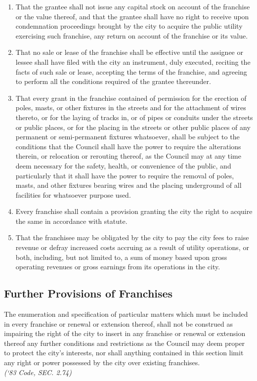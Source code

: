 \begin{enumerate}
    \item That the grantee shall not issue any capital stock on account of the franchise or the value thereof, and that the grantee shall have no right to receive upon condemnation proceedings brought by the city to acquire the public utility exercising such franchise, any return on account of the franchise or its value.
    \item That no sale or lease of the franchise shall be effective until the assignee or lessee shall have filed with the city an instrument, duly executed, reciting the facts of such sale or lease, accepting the terms of the franchise, and agreeing to perform all the conditions required of the grantee thereunder.
    \item That every grant in the franchise contained of permission for the erection of poles, masts, or other fixtures in the streets and for the attachment of wires thereto, or for the laying of tracks in, or of pipes or conduits under the streets or public places, or for the placing in the streets or other public places of any permanent or semi-permanent fixtures whatsoever, shall be subject to the conditions that the Council shall have the power to require the alterations therein, or relocation or rerouting thereof, as the Council may at any time deem necessary for the safety, health, or convenience of the public, and particularly that it shall have the power to require the removal of poles, masts, and other fixtures bearing wires and the placing underground of all facilities for whatsoever purpose used.
    \item Every franchise shall contain a provision granting the city the right to acquire the same in accordance with statute.
    \item That the franchisee may be obligated by the city to pay the city fees to raise revenue or defray increased costs accruing as a result of utility operations, or both, including, but not limited to, a sum of money based upon gross operating revenues or gross earnings from its operations in the city.
\end{enumerate}
\subsection{Further Provisions of Franchises}
The enumeration and specification of particular matters which must be included in every franchise or renewal or extension thereof, shall not be construed as impairing the right of the city to insert in any franchise or renewal or extension thereof any further conditions and restrictions as the Council may deem proper to protect the city’s interests, nor shall anything contained in this section limit any right or power possessed by the city over existing franchises.\\
\emph{(‘83 Code, SEC. 2.74)}

